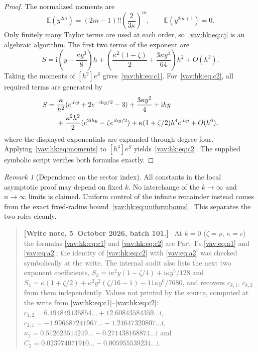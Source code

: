 \documentclass[11pt]{article}
\theoremstyle{remark}\newtheorem{remark}[theorem]{Remark}
\newcommand{\ii}{\mathrm i}
\newenvironment{writenoteb}{\begin{quote}\small\raggedright\textbf{[Write note, 5~October 2026, batch 101.]}\ }{\end{quote}}
\begin{document}
\begin{proof}
The normalized moments are
\begin{equation}\label{vav:hk:eq:moments}
 \mathbb E(y^{2m})=(2m-1)!!\left(\frac2{3\kappa}\right)^m,
 \qquad \mathbb E(y^{2m+1})=0.
\end{equation}
Only finitely many Taylor terms are used at each order, so~\eqref{vav:hk:eq:cj} is an algebraic algorithm. The first two terms of the exponent are
\begin{equation}\label{vav:hk:eq:S12}
 S=\ii\left(y-\frac{\kappa y^3}{8}\right)h
 +\left(\frac{\kappa^2(1-\zeta)}2+\frac{3\kappa y^4}{64}\right)h^2
 +O(h^3).
\end{equation}
Taking the moments of $[h^2]e^S$ gives~\eqref{vav:hk:eq:c1}. For~\eqref{vav:hk:eq:c2}, all required terms are generated by
\begin{align}\label{vav:hk:eq:S4}
 S={}&\frac{\kappa}{h^2}
       (e^{\ii hy}+2e^{-\ii hy/2}-3)
       +\frac{3\kappa y^2}4+\ii hy\notag\\
    &+\frac{\kappa^2h^2}{2}(e^{2\ii hy}-\zeta e^{\ii hy/2})
       +\kappa(1+\zeta/2)h^4e^{\ii hy}+O(h^6),
\end{align}
where the displayed exponentials are expanded through degree four. Applying~\eqref{vav:hk:eq:moments} to $[h^4]e^S$ yields~\eqref{vav:hk:eq:c2}. The supplied symbolic script verifies both formulas exactly.
\end{proof}

\begin{remark}[Dependence on the sector index]
All constants in the local asymptotic proof may depend on fixed $k$. No interchange of the $k\to\infty$ and $n\to\infty$ limits is claimed. Uniform control of the infinite remainder instead comes from the exact fixed-radius bound~\eqref{vav:hk:eq:uniformbound}. This separates the two roles cleanly.
\end{remark}
\begin{writenoteb}
At $k=0$ ($\zeta=\rho$, $\kappa=c$) the formulas \eqref{vav:hk:eq:c1} and
\eqref{vav:hk:eq:c2} are Part~I's \eqref{vav:eq:a1} and \eqref{vav:eq:a2};
the identity of \eqref{vav:hk:eq:c2} with \eqref{vav:eq:a2} was checked
symbolically at the write. The internal audit
 also lists the next two
exponent coefficients,
$S_3=\ii\kappa^2y(1-\zeta/4)+\ii\kappa y^5/128$ and
$S_4=\kappa(1+\zeta/2)+\kappa^2y^2(\zeta/16-1)-11\kappa y^6/7680$, and
recovers $c_{k,1}$, $c_{k,2}$ from them independently. Values not printed
by the source, computed at the write from \eqref{vav:hk:eq:c1}--\eqref{vav:hk:eq:c2}:
$c_{1,2}=6.194849135854\ldots+12.60843584359\ldots\ii$,
$c_{2,1}=-1.996687241967\ldots-1.24647320807\ldots\ii$,
$\kappa_2=0.512623514249\ldots-0.271438168874\ldots\ii$ and
$C_2=0.023974071910\ldots-0.005955539234\ldots\ii$.
\end{writenoteb}
\end{document}
